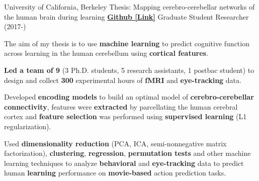 

\begin{cventries}

  \cventry
    {University of California, Berkeley} %
    {Thesis: Mapping cerebro-cerebellar networks of the human brain during learning}
    {\href{https://github.com/maedbhk/cerebellum_learning_connect}{\textbf{Github [Link]}}}
    {Graduate Student Researcher (2017-)} %
    {
      \begin{cvitems} %
        \item {The aim of my thesis is to use \textbf{machine learning} to predict cognitive function across learning in the human cerebellum using \textbf{cortical features}.} 
        \item {\textbf{Led a team of 9} (3 Ph.D. students, 5 research assistants, 1 postbac student) to design and collect \textbf{300} experimental hours of \textbf{fMRI} and \textbf{eye-tracking} data.}
        \item {Developed \textbf{encoding models} to build an optimal model of \textbf{cerebro-cerebellar connectivity}, features were \textbf{extracted} by parcellating the human cerebral cortex and \textbf{feature selection} was performed using \textbf{supervised learning} (L1 regularization).}
        \item {Used \textbf{dimensionality reduction} (PCA, ICA, semi-nonnegative matrix factorization), \textbf{clustering}, \textbf{regression}, \textbf{permutation tests} and other machine learning techniques to analyze \textbf{behavioral} and \textbf{eye-tracking} data to predict human \textbf{learning} performance on \textbf{movie-based} action prediction tasks.}
      \end{cvitems}
    }
    

\end{cventries}
